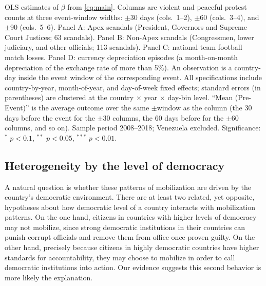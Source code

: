 \documentclass[11pt]{article}
\let\mathbetasym\beta
\renewcommand{\beta}{\ensuremath{\mathbetasym}}
\begin{document}
\begin{table}[htb!]
    \caption{Violent protests increase after apex corruption scandal disclosures.}
    \label{tab:main}
    \begin{center}
        \scriptsize{}
    \end{center}
    \footnotesize{OLS estimates of $\beta$ from \autoref{eq:main}. Columns are violent and peaceful protest counts at three event-window widths: $\pm$30 days (cols.\ 1--2), $\pm$60 (cols.\ 3--4), and $\pm$90 (cols.\ 5--6). Panel A: Apex scandals (President, Governors and Supreme Court Justices; 63 scandals). Panel B: Non-Apex scandals (Congressmen, lower judiciary, and other officials; 113 scandals). Panel C: national-team football match losses. Panel D: currency depreciation episodes (a month-on-month depreciation of the exchange rate of more than 5\%). An observation is a country-day inside the event window of the corresponding event. All specifications include country-by-year, month-of-year, and day-of-week fixed effects; standard errors (in parentheses) are clustered at the country $\times$ year $\times$ day-bin level. ``Mean (Pre-Event)'' is the average outcome over the same $\pm$window as the column (the 30 days before the event for the $\pm$30 columns, the 60 days before for the $\pm$60 columns, and so on). Sample period 2008--2018; Venezuela excluded. Significance: $^{*}$ $p<0.1$, $^{**}$ $p<0.05$, $^{***}$ $p<0.01$.}
\end{table}

\subsection{Heterogeneity by the level of democracy}

A natural question is whether these patterns of mobilization are driven by the country's democratic environment. There are at least two related, yet opposite, hypotheses about how democratic level of a country interacts with mobilization patterns. On the one hand, citizens in countries with higher levels of democracy may not mobilize, since strong democratic institutions in their countries can punish corrupt officials and remove them from office once proven guilty. On the other hand, precisely because citizens in highly democratic countries have higher standards for accountability, they may choose to mobilize in order to call democratic institutions into action. Our evidence suggests this second behavior is more likely the explanation. 
\end{document}
